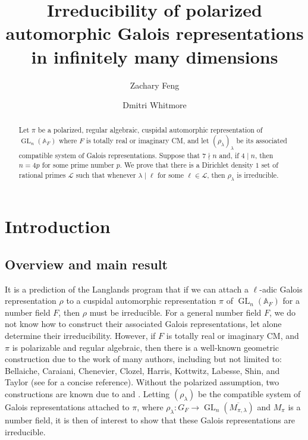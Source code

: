 \documentclass{amsart}
\author{Zachary Feng}
\author{Dmitri Whitmore}
\title[Irreducibility of Galois representations in many dimensions]{Irreducibility of polarized automorphic Galois representations in infinitely many dimensions}
\theoremstyle{definition}
\numberwithin{equation}{section} %
\newcommand{\GL}{\operatorname{GL}}
\newcommand{\bb}[1]{\mathbb{#1}}
\newcommand{\mc}[1]{\mathcal{#1}}
\newcommand{\ol}[1]{\overline{#1}}
\begin{document}
\begin{abstract}
    Let \( \pi \) be a polarized, regular algebraic, cuspidal automorphic representation of \( \GL_n(\bb{A}_F) \) where \( F \) is totally real or imaginary CM, and let \( (\rho_\lambda)_\lambda \) be its associated compatible system of Galois representations.
    Suppose that \( 7\nmid n \) and, if \( 4\mid n \), then $n = 4p$ for some prime number $p$.
    We prove that there is a Dirichlet density \( 1 \) set of rational primes \( \mc{L} \) such that whenever \( \lambda\mid \ell \) for some \( \ell\in \mc{L} \), then \( \rho_\lambda \) is irreducible.
\end{abstract}

\maketitle
\tableofcontents

\section{Introduction}

\subsection{Overview and main result}

It is a prediction of the Langlands program that if we can attach a \(\ell\)-adic Galois representation $\rho$ to a cuspidal automorphic representation \( \pi \) of \( \GL_n(\bb{A}_F) \) for a number field \( F \), then $\rho$ must be irreducible. For a general number field \( F \), we do not know how to construct their associated Galois representations, let alone determine their irreducibility. However, if \( F \) is totally real or imaginary CM, and \( \pi \) is polarizable and regular algebraic, then there is a well-known geometric construction due to the work of many authors, including but not limited to: Bellaiche, Caraiani, Chenevier, Clozel, Harris, Kottwitz, Labesse, Shin, and Taylor (see \cite[Theorem 2.1.1]{BLGGT14} for a concise reference). Without the polarized assumption, two constructions are known due to \cite{HLTT16} and \cite{Scholz15}.
Letting \( (\rho_\lambda) \) be the compatible system of Galois representations attached to \( \pi \), where \( \rho_\lambda:G_F\to\GL_n(\ol{M_{\pi,\lambda}}) \) and \( M_\pi \) is a number field, it is then of interest to show that these Galois representations are irreducible. 
\end{document}

